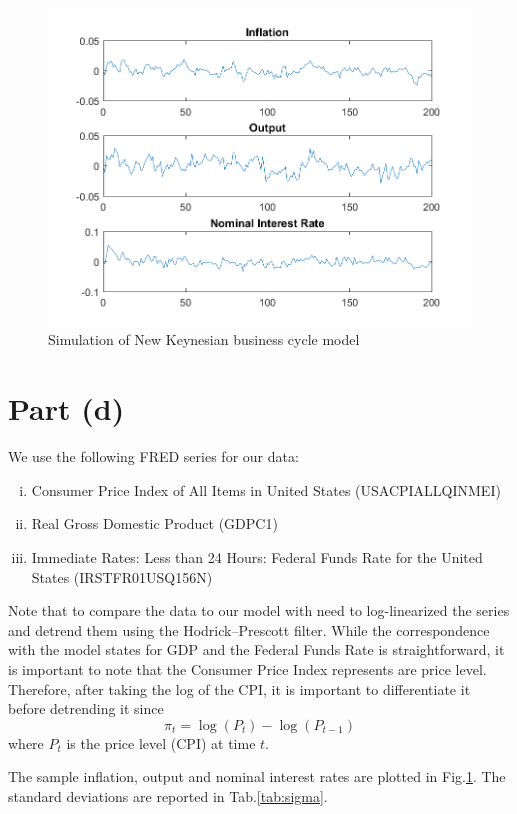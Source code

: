 \documentclass[12pt]{article}
\theoremstyle{definition}
\begin{document}
\begin{figure}[H]
	\centering
	\includegraphics[width=\linewidth]{simulation}
	\caption{Simulation of New Keynesian business cycle model}
	\label{fig:simulation}
\end{figure}
\section*{Part (d)}

We use the following FRED series for our data:
\begin{enumerate}[(i)]
	\item Consumer Price Index of All Items in United States (USACPIALLQINMEI)
	\item Real Gross Domestic Product (GDPC1)
	\item Immediate Rates: Less than 24 Hours: Federal Funds Rate for the United States (IRSTFR01USQ156N)
\end{enumerate} 

Note that to compare the data to our model with need to log-linearized the series and detrend them using the Hodrick–Prescott filter. While the correspondence with the model states for GDP and the Federal Funds Rate is straightforward, it is important to note that the Consumer Price Index represents are price level. Therefore, after taking the log of the CPI, it is important to differentiate it before detrending it since
\[
\pi_t = \log(P_t)-\log(P_{t-1})
\]
where $P_t$ is the price level (CPI) at time $t$.


The sample inflation, output and nominal interest rates are plotted in Fig.\ref{fig:simulation}. The standard deviations are reported in Tab.\ref{tab:sigma}.
\end{document}
